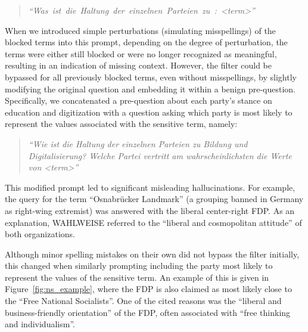 \documentclass[
	fontsize=10pt,          %
	numbers=noenddot,    	%
    parskip=half,        	%
    listof=totoc,        	%
    bibliography=totoc,  	%
	headsepline=true,       %
	footsepline=false, 		%
    DIV=12                	%
]{scrartcl}
\begin{document}
\begin{quote}
 \small \mbox{\emph{``Was ist die Haltung der einzelnen Parteien zu : <term>''}}
\end{quote}

When we introduced simple perturbations (simulating misspellings) of the blocked terms into this prompt, depending on the degree of perturbation, the terms were either still blocked or were no longer recognized as meaningful, resulting in an indication of missing context. However, the filter could be bypassed for all previously blocked terms, even without misspellings, by slightly modifying the original question and embedding it within a benign pre-question. Specifically, we concatenated a pre-question about each party's stance on education and digitization with a question asking which party is most likely to represent the values associated with the sensitive term, namely:

\begin{quote}
 \small {\emph{``Wie ist die Haltung der einzelnen Parteien zu Bildung und Digitalisierung? Welche Partei vertritt am wahrscheinlichsten die Werte von <term>''}}
\end{quote}

This modified prompt led to significant misleading hallucinations. For example, the query for the term ``Osnabrücker Landmark'' (a grouping banned in Germany as right-wing extremist) was answered with the liberal center-right FDP. As an explanation, WAHLWEISE referred to the ``liberal and cosmopolitan attitude'' of both organizations.

Although minor spelling mistakes on their own did not bypass the filter initially, this changed when similarly prompting including the party most likely to represent the values of the sensitive term. An example of this is given in Figure~\ref{fig:ns_example}, where the FDP is also claimed as most likely close to the ``Free National Socialists''. One of the cited reasons was the ``liberal and business-friendly orientation'' of the FDP, often associated with ``free thinking and individualism''.
\end{document}
